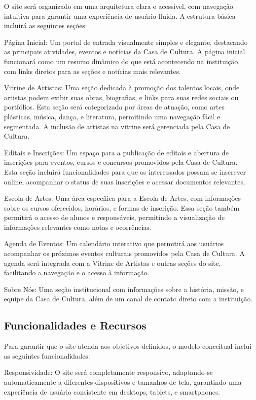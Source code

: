 O site será organizado em uma arquitetura clara e acessível, com navegação intuitiva para garantir uma experiência de usuário fluida. A estrutura básica incluirá as seguintes seções:

Página Inicial: Um portal de entrada visualmente simples e elegante, destacando as principais atividades, eventos e notícias da Casa de Cultura. A página inicial funcionará como um resumo dinâmico do que está acontecendo na instituição, com links diretos para as seções e notícias mais relevantes.

Vitrine de Artistas: Uma seção dedicada à promoção dos talentos locais, onde artistas podem exibir suas obras, biografias, e links para suas redes sociais ou portfólios. Esta seção será categorizada por áreas de atuação, como artes plásticas, música, dança, e literatura, permitindo uma navegação fácil e segmentada. A inclusão de artistas na vitrine será gerenciada pela Casa de Cultura.

Editais e Inscrições: Um espaço para a publicação de editais e abertura de inscrições para eventos, cursos e concursos promovidos pela Casa de Cultura. Esta seção incluirá funcionalidades para que os interessados possam se inscrever online, acompanhar o status de suas inscrições e acessar documentos relevantes.

Escola de Artes: Uma área específica para a Escola de Artes, com informações sobre os cursos oferecidos, horários, e formas de inscrição. Essa seção também permitirá o acesso de alunos e responsáveis, permitindo a visualização de informações relevantes como notas e ocorrências.

Agenda de Eventos: Um calendário interativo que permitirá aos usuários acompanhar os próximos eventos culturais promovidos pela Casa de Cultura. A agenda será integrada com a Vitrine de Artistas e outras seções do site, facilitando a navegação e o acesso à informação.

Sobre Nós: Uma seção institucional com informações sobre a história, missão, e equipe da Casa de Cultura, além de um canal de contato direto com a instituição.

\subsection{Funcionalidades e Recursos}

Para garantir que o site atenda aos objetivos definidos, o modelo conceitual inclui as seguintes funcionalidades:

Responsividade: O site será completamente responsivo, adaptando-se automaticamente a diferentes dispositivos e tamanhos de tela, garantindo uma experiência de usuário consistente em desktops, tablets, e smartphones.

